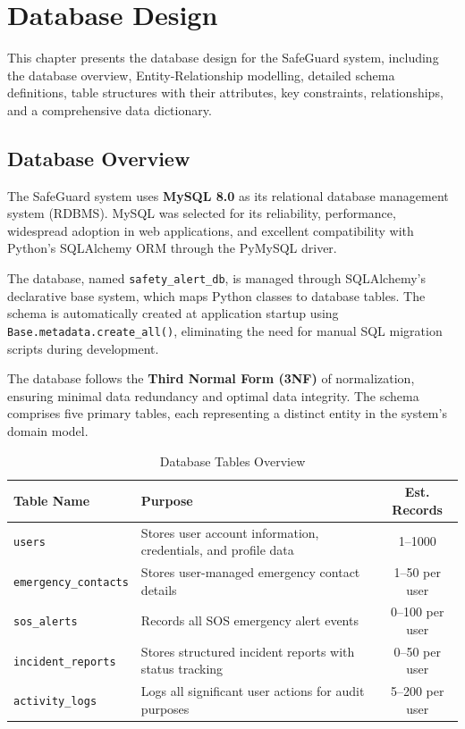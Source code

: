 \chapter{Database Design}

This chapter presents the database design for the SafeGuard system, including the database overview, Entity-Relationship modelling, detailed schema definitions, table structures with their attributes, key constraints, relationships, and a comprehensive data dictionary.

\section{Database Overview}

The SafeGuard system uses \textbf{MySQL 8.0} as its relational database management system (RDBMS). MySQL was selected for its reliability, performance, widespread adoption in web applications, and excellent compatibility with Python's SQLAlchemy ORM through the PyMySQL driver.

The database, named \texttt{safety\_alert\_db}, is managed through SQLAlchemy's declarative base system, which maps Python classes to database tables. The schema is automatically created at application startup using \texttt{Base.metadata.create\_all()}, eliminating the need for manual SQL migration scripts during development.

The database follows the \textbf{Third Normal Form (3NF)} of normalization, ensuring minimal data redundancy and optimal data integrity. The schema comprises five primary tables, each representing a distinct entity in the system's domain model.

\begin{table}[H]
  \centering
  \caption{Database Tables Overview}
  \label{tab:db-overview}
  \begin{tabularx}{\textwidth}{@{}l X c@{}}
    \toprule
    \textbf{Table Name} & \textbf{Purpose} & \textbf{Est. Records} \\
    \midrule
    \texttt{users} & Stores user account information, credentials, and profile data & 1--1000 \\
    \texttt{emergency\_contacts} & Stores user-managed emergency contact details & 1--50 per user \\
    \texttt{sos\_alerts} & Records all SOS emergency alert events & 0--100 per user \\
    \texttt{incident\_reports} & Stores structured incident reports with status tracking & 0--50 per user \\
    \texttt{activity\_logs} & Logs all significant user actions for audit purposes & 5--200 per user \\
    \bottomrule
  \end{tabularx}
\end{table}

